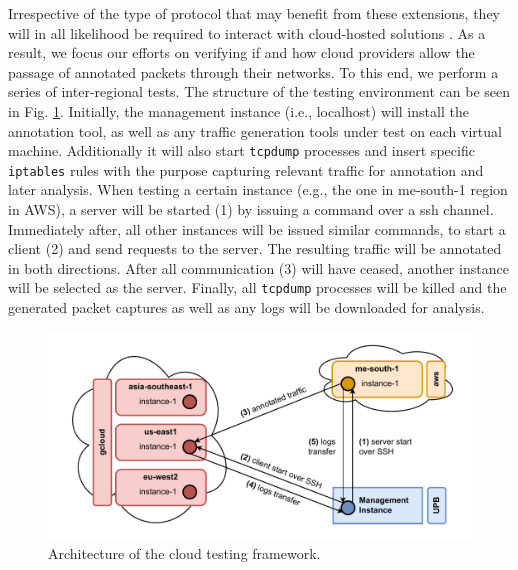 Irrespective of the type of protocol that may benefit from these extensions, they will in all likelihood be required to interact with cloud-hosted solutions \cite{daielephant}. As a result, we focus our efforts on verifying if and how cloud providers allow the passage of annotated packets through their networks. To this end, we perform a series of inter-regional tests. The structure of the testing environment can be seen in Fig. \ref{extend:ops:fig:architecture}. Initially, the management instance (i.e., localhost) will install the annotation tool, as well as any traffic generation tools under test on each virtual machine. Additionally it will also start \texttt{tcpdump} processes and insert specific \texttt{iptables} rules with the purpose capturing relevant traffic for annotation and later analysis. When testing a certain instance (e.g., the one in me-south-1 region in AWS), a server will be started (1) by issuing a command over a ssh channel. Immediately after, all other instances will be issued similar commands, to start a client (2) and send requests to the server. The resulting traffic will be annotated in both directions. After all communication (3) will have ceased, another instance will be selected as the server. Finally, all \texttt{tcpdump} processes will be killed and the generated packet captures as well as any logs will be downloaded for analysis.

\begin{figure}[htb]
    \centering
    \includegraphics[width=\textwidth,keepaspectratio]{figures/architecture.pdf}
    \caption{Architecture of the cloud testing framework.}
    \label{extend:ops:fig:architecture}
\end{figure}

